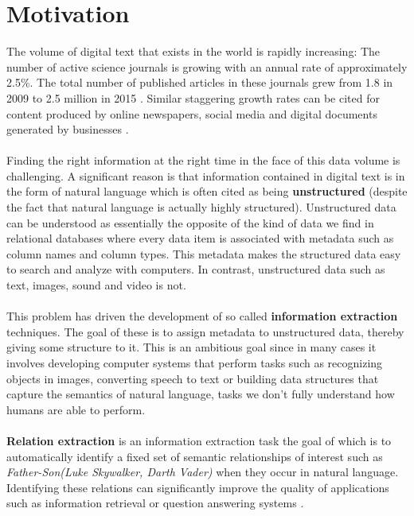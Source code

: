 \section{Motivation}
The volume of digital text that exists in the world is rapidly increasing: The number of active science journals is growing with an annual rate of approximately 2.5\%. The total number of published articles in these journals grew from 1.8 in 2009 to 2.5 million in 2015 \citep{ware2009, ware2015}. Similar staggering growth rates can be cited for content produced by online newspapers, social media and digital documents generated by businesses \citep{perrin2015, mitchell2015}.
\\\\
Finding the right information at the right time in the face of this data volume is challenging. A significant reason is that information contained in digital text is in the form of natural language which is often cited as being \textbf{unstructured} (despite the fact that natural language is actually highly structured). Unstructured data can be understood as essentially the opposite of the kind of data we find in relational databases where every data item is associated with metadata such as column names and column types. This metadata makes the structured data easy to search and analyze with computers. In contrast, unstructured data such as text, images, sound and video is not.
\\\\
This problem has driven the development of so called \textbf{information extraction} techniques. The goal of these is to assign metadata to unstructured data, thereby giving some structure to it. This is an ambitious goal since in many cases it involves developing computer systems that perform tasks such as recognizing objects in images, converting speech to text or building data structures that capture the semantics of natural language, tasks we don't fully understand how humans are able to perform.
\\\\
\textbf{Relation extraction} is an information extraction task the goal of which is to automatically identify a fixed set of semantic relationships of interest such as \textit{Father-Son(Luke Skywalker, Darth Vader)} when they occur in natural language. Identifying these relations can significantly improve the quality of applications such as information retrieval or question answering systems \citep{jurafsky09}.

